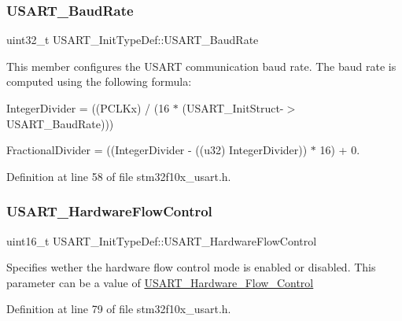 \subsubsection{\texorpdfstring{U\+S\+A\+R\+T\+\_\+\+Baud\+Rate}{USART\_BaudRate}}
{\footnotesize\ttfamily uint32\+\_\+t U\+S\+A\+R\+T\+\_\+\+Init\+Type\+Def\+::\+U\+S\+A\+R\+T\+\_\+\+Baud\+Rate}

This member configures the U\+S\+A\+RT communication baud rate. The baud rate is computed using the following formula\+:
\begin{DoxyItemize}
\item Integer\+Divider = ((P\+C\+L\+Kx) / (16 $\ast$ (U\+S\+A\+R\+T\+\_\+\+Init\+Struct-\/$>$U\+S\+A\+R\+T\+\_\+\+Baud\+Rate)))
\item Fractional\+Divider = ((Integer\+Divider -\/ ((u32) Integer\+Divider)) $\ast$ 16) + 0. 
\end{DoxyItemize}

Definition at line 58 of file stm32f10x\+\_\+usart.\+h.

\mbox{\label{struct_u_s_a_r_t___init_type_def_a9996edf3bfd90c36f03b4075969703f5}} 
\subsubsection{\texorpdfstring{U\+S\+A\+R\+T\+\_\+\+Hardware\+Flow\+Control}{USART\_HardwareFlowControl}}
{\footnotesize\ttfamily uint16\+\_\+t U\+S\+A\+R\+T\+\_\+\+Init\+Type\+Def\+::\+U\+S\+A\+R\+T\+\_\+\+Hardware\+Flow\+Control}

Specifies wether the hardware flow control mode is enabled or disabled. This parameter can be a value of \hyperlink{group___u_s_a_r_t___hardware___flow___control}{U\+S\+A\+R\+T\+\_\+\+Hardware\+\_\+\+Flow\+\_\+\+Control} 

Definition at line 79 of file stm32f10x\+\_\+usart.\+h.

\mbox{\label{struct_u_s_a_r_t___init_type_def_a7d944d35d7d1fc79a63f249615148584}} 
